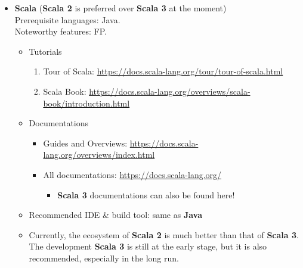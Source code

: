 \documentclass{article}
\begin{document}
\begin{itemize}
    \item \textbf{Scala}
    (\textbf{Scala 2} is preferred over \textbf{Scala 3} at the moment)\\
    Prerequisite languages: Java.\\
    Noteworthy features: FP.
    \begin{itemize}
        \item Tutorials
        \begin{enumerate}
            \item Tour of Scala:
            \href{https://docs.scala-lang.org/tour/tour-of-scala.html}{https://docs.scala-lang.org/tour/tour-of-scala.html}
            \item Scala Book:
            \href{https://docs.scala-lang.org/overviews/scala-book/introduction.html}{https://docs.scala-lang.org/overviews/scala-book/introduction.html}
        \end{enumerate}
        \item Documentations
        \begin{itemize}
            \item Guides and Overviews:
            \href{https://docs.scala-lang.org/overviews/index.html}{https://docs.scala-lang.org/overviews/index.html}
            \item All documentations:
            \href{https://docs.scala-lang.org/}{https://docs.scala-lang.org/}
                \begin{itemize}
                    \item \textbf{Scala 3} documentations can also be found here!
                \end{itemize}
        \end{itemize}
        \item Recommended IDE \& build tool: same as \textbf{Java}
        \item Currently, the ecosystem of \textbf{Scala 2} is much better than that of \textbf{Scala 3}.
        The development \textbf{Scala 3} is still at the early stage, but it is also recommended, especially in the long run.
        \end{itemize}
        

\end{itemize}
\end{document}
